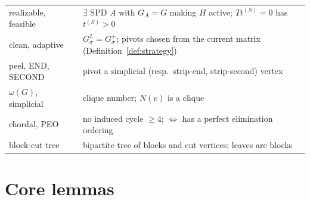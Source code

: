 \documentclass[11pt]{article}
\theoremstyle{plain}
\theoremstyle{definition}
\theoremstyle{remark}
\begin{document}
\begin{aiblock}
\begin{table}[H]
\begin{tabular}{ll}
realizable, feasible & $\exists$ SPD $A$ with $G_A=G$ making $H$ active; $Tt^{(S)}=0$ has $t^{(S)}>0$\\
clean, adaptive & $G^L_\sigma=G^+_\sigma$; pivots chosen from the current matrix (Definition~\ref{def:strategy})\\
peel, END, SECOND & pivot a simplicial (resp.\ strip-end, strip-second) vertex\\
$\omega(G)$, simplicial & clique number; $N(v)$ is a clique\\
chordal, PEO & no induced cycle $\ge4$; $\iff$ has a perfect elimination ordering \cite{Dirac,Fulkerson}\\
block-cut tree & bipartite tree of blocks and cut vertices; leaves are blocks\\
\bottomrule
\end{tabular}
\end{table}
\end{aiblock}

\section{Core lemmas}\label{sec:core}
\end{document}
